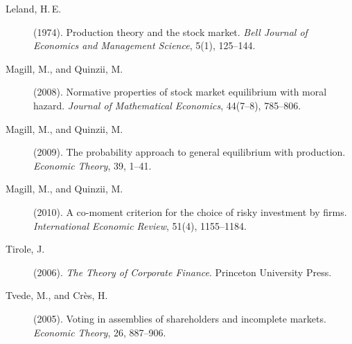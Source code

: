 \documentclass[11pt,a4paper]{article}
\theoremstyle{plain}
\theoremstyle{definition}
\theoremstyle{remark}
\begin{document}
\begin{description}
\item[Leland, H.\,E.] (1974). Production theory and the stock market. \emph{Bell Journal of Economics and Management Science}, 5(1), 125--144.

\item[Magill, M., and Quinzii, M.] (2008). Normative properties of stock market equilibrium with moral hazard. \emph{Journal of Mathematical Economics}, 44(7--8), 785--806.

\item[Magill, M., and Quinzii, M.] (2009). The probability approach to general equilibrium with production. \emph{Economic Theory}, 39, 1--41.

\item[Magill, M., and Quinzii, M.] (2010). A co-moment criterion for the choice of risky investment by firms. \emph{International Economic Review}, 51(4), 1155--1184.

\item[Tirole, J.] (2006). \emph{The Theory of Corporate Finance}. Princeton University Press.

\item[Tvede, M., and Crès, H.] (2005). Voting in assemblies of shareholders and incomplete markets. \emph{Economic Theory}, 26, 887--906.

\end{description}
\end{document}
